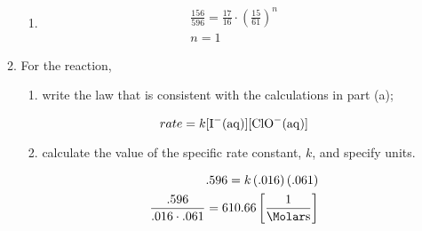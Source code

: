 \documentclass[12pt]{article}
\begin{document}
\begin{enumerate}
\begin{enumerate}
\begin{enumerate}
          \item {}

            \begin{equation}
              \begin{split}
                \frac{156}{596}=\frac{17}{16}\cdot\left( \frac{15}{61} \right)^n\\
                n=1
              \end{split}
              \label{2}
            \end{equation}

        \end{enumerate}

      \item For the reaction,

        \begin{enumerate}

          \item write the law that is consistent with the calculations in part (a);

            \begin{equation}
              rate=k[\ce{I-(aq)}][\ce{ClO-(aq)}]
              \label{3}
            \end{equation}

          \item calculate the value of the specific rate constant, $k$, and specify units.

            \begin{equation}
              \begin{split}
                .596=k\left( .016 \right)\left( .061 \right)\\
                \frac{.596}{.016\cdot.061}=610.66\left[ \frac{1}{\si{\Molar\second}} \right]
              \end{split}
              \label{4}
            \end{equation}

        \end{enumerate}

    \end{enumerate}

\end{enumerate}
\end{document}
